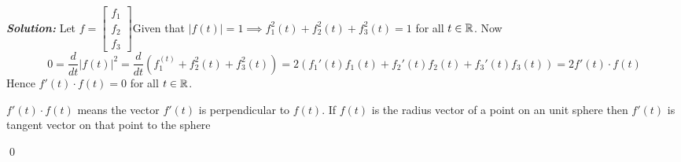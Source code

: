 \documentclass[a4paper, 11pt]{article}
\newcommand{\Qed}{\begin{flushright}\qed\end{flushright}}
\newcommand{\sol}[1]{\begin{solution}#1\end{solution}\Qed}
\newenvironment{solution}
{\textbf{\textit{Solution: }}\setlength{\parindent}{1cm}}
{}
\begin{document}
	\sol{Let $f=\begin{bmatrix}
			f_1\\ f_2\\ f_3
		\end{bmatrix}$Given that $|f(t)|=1\implies f_1^2(t)+f_2^2(t)+f_3^2(t)=1$ for all $t\in \mathbb{R}$. Now $$0=\frac{d}{dt}|f(t)|^2=\frac{d}{dt}(f_1^(t)+f_2^2(t)+f_3^2(t))=2(f_1'(t)f_1(t)+f_2'(t)f_2(t)+f_3'(t)f_3(t))=2f'(t)\cdot f(t)$$Hence $f'(t)\cdot f(t)=0$ for all $t\in \mathbb{R}$.
	
	$f'(t)\cdot f(t)$ means the vector $f'(t)$ is perpendicular to $f(t)$. If $f(t)$ is the radius vector of a point on an unit sphere then $f'(t)$ is tangent vector on that point to the sphere
}
	
\end{document}
